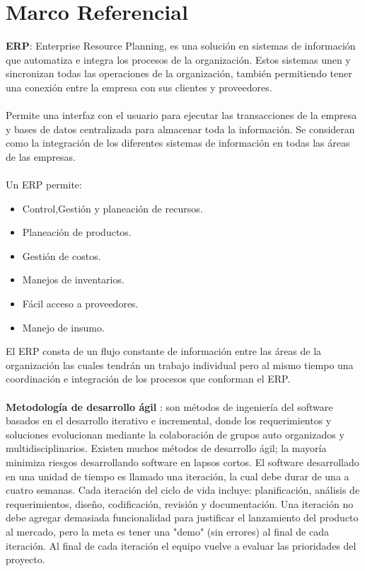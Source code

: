 \section{Marco Referencial}
%
\textbf{ERP}: Enterprise Resource Planning, es una soluci\'on en sistemas de informaci\'on que automatiza e integra  los procesos de la organizaci\'on. Estos sistemas unen y sincronizan todas las operaciones de la organizaci\'on, tambi\'en permitiendo tener una conexi\'on entre la empresa con sus clientes y proveedores.%
\\%
\\%
Permite una interfaz con el usuario para ejecutar las transacciones de la empresa y bases de datos centralizada para almacenar toda la informaci\'on. Se consideran como la integraci\'on de los diferentes sistemas de informaci\'on en todas las \'areas de las empresas.%
\\%
\\%
Un ERP permite:%
\\%
\begin{itemize}
	\item Control,Gesti\'on y planeaci\'on de recursos.
	\item Planeaci\'on de productos.
	\item Gesti\'on de costos.
	\item Manejos de inventarios.
	\item F\'acil acceso a proveedores.
	\item Manejo de insumo.
\end{itemize}
%
El ERP consta de un flujo constante de informaci\'on entre las \'areas de la organizaci\'on las cuales tendr\'an un trabajo individual pero al mismo tiempo una coordinaci\'on e integraci\'on de los procesos que conforman el ERP.%
\\%
\\%
\textbf{Metodolog\'ia de desarrollo \'agil }: son m\'etodos de ingenier\'ia del software basados en el desarrollo iterativo e incremental, donde los requerimientos y soluciones evolucionan mediante la colaboraci\'on de grupos auto organizados y multidisciplinarios. Existen muchos m\'etodos de desarrollo \'agil; la mayor\'ia minimiza riesgos desarrollando software en lapsos cortos. El software desarrollado en una unidad de tiempo es llamado una iteraci\'on, la cual debe durar de una a cuatro semanas. Cada iteraci\'on del ciclo de vida incluye: planificaci\'on, an\'alisis de requerimientos, dise\~no, codificaci\'on, revisi\'on y documentaci\'on. Una iteraci\'on no debe agregar demasiada funcionalidad para justificar el lanzamiento del producto al mercado, pero la meta es tener una "demo" (sin errores) al final de cada iteraci\'on. Al final de cada iteraci\'on el equipo vuelve a evaluar las prioridades del proyecto.%
